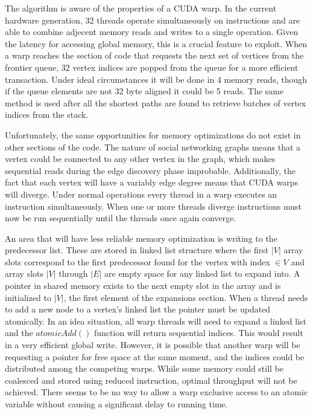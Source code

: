 \documentclass[10pt,twocolumn]{article}
\begin{document}
The algorithm is aware of the properties of a CUDA warp. In the current hardware generation, 32 threads operate simultaneously on instructions and are able to combine adjecent memory reads and writes to a single operation. Given the latency for accessing global memory, this is a crucial feature to exploit. When a warp reaches the section of code that requests the next set of vertices from the frontier queue, 32 vertex indices are popped from the queue for a more efficient transaction. Under ideal circumstances it will be done in 4 memory reads, though if the queue elements are not 32 byte aligned it could be 5 reads. The same method is used after all the shortest paths are found to retrieve batches of vertex indices from the stack.
 
Unfortunately, the same opportunities for memory optimizations do not exist in other sections of the code. The nature of social networking graphs means that a vertex could be connected to any other vertex in the graph, which makes sequential reads during the edge discovery phase improbable. Additionally, the fact that each vertex will have a variably edge degree means that CUDA warps will diverge. Under normal operations every thread in a warp executes an instruction simultaneously. When one or more threads diverge instructions must now be run sequentially until the threads once again converge.
 
An area that will have less reliable memory optimization is writing to the predecessor list. These are stored in linked list structure where the first $|V|$ array slots correspond to the first predecessor found for the vertex with index $ \in V$ and array slots $|V|$ through $|E|$ are empty space for any linked list to expand into. A pointer in shared memory exists to the next empty slot in the array and is initialized to $|V|$, the first element of the expansions section. When a thread needs to add a new node to a vertex's linked list the pointer must be updated atomically. In an idea situation, all warp threads will need to expand a linked list and the $atomicAdd()$ function will return sequential indices. This would result in a very efficient global write. However, it is possible that another warp will be requesting a pointer for free space at the same moment, and the indices could be distributed among the competing warps. While some memory could still be coalesced and stored using reduced instruction, optimal throughput will not be achieved. There seems to be no way to allow a warp exclusive access to an atomic variable without causing a significant delay to running time.
\end{document}
